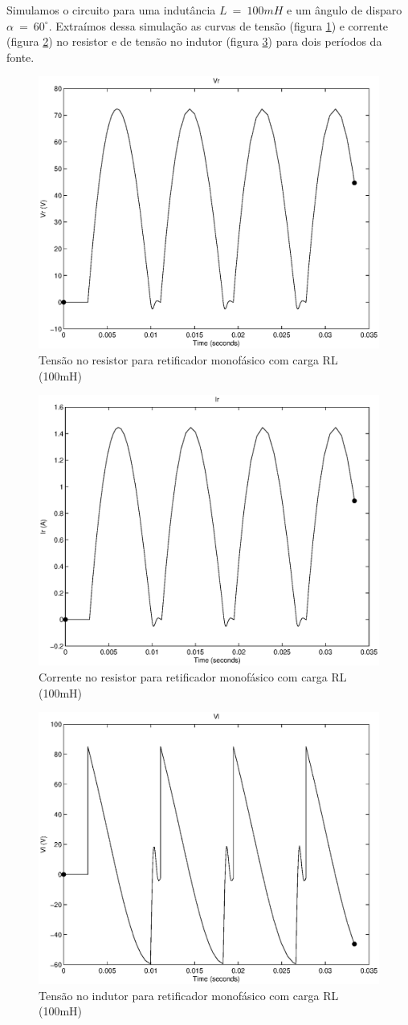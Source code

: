 \documentclass{report}
\begin{document}
Simulamos o circuito para uma indutância $L\ =\ 100mH$ e um ângulo de disparo $\alpha\ =\ 60^\circ$. Extraímos dessa simulação as curvas de tensão (figura \ref{fig:rlvr}) e corrente (figura \ref{fig:rlir}) no resistor e de tensão no indutor (figura \ref{fig:rlvl}) para dois períodos da fonte.
\begin{figure}[H]
	\centering
	\includegraphics[width=0.7\linewidth]{matlab/rl_vr}
	\caption{Tensão no resistor para retificador monofásico com carga RL (100mH)}
	\label{fig:rlvr}
\end{figure}
\begin{figure}[H]
	\centering
	\includegraphics[width=0.7\linewidth]{matlab/rl_ir}
	\caption{Corrente no resistor para retificador monofásico com carga RL (100mH)}
	\label{fig:rlir}
\end{figure}
\begin{figure}[H]
	\centering
	\includegraphics[width=0.7\linewidth]{matlab/rl_vl}
	\caption{Tensão no indutor para retificador monofásico com carga RL (100mH)}
	\label{fig:rlvl}
\end{figure}
\end{document}
